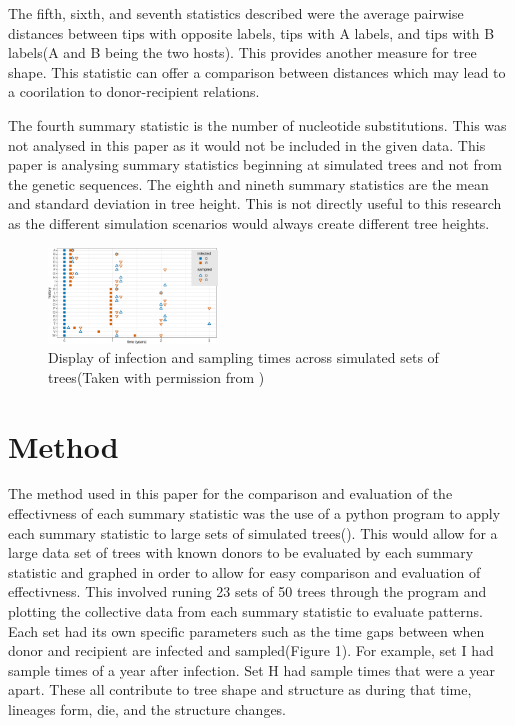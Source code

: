 \documentclass[final,5p,times,twocolumn,authoryear]{elsarticle}
\begin{document}
The fifth, sixth, and seventh statistics described were the average pairwise distances between tips with opposite labels, tips with A labels, and tips with B labels(A and B being the two hosts). This provides another measure for tree shape. This statistic can offer a comparison between distances which may lead to a coorilation to donor-recipient relations.

The fourth summary statistic is the number of nucleotide substitutions. This was not analysed in this paper as it would not be included in the given data. This paper is analysing summary statistics beginning at simulated trees and not from the genetic sequences. The eighth and nineth summary statistics are the mean and standard deviation in tree height. This is not directly useful to this research as the different simulation scenarios would always create different tree heights.


\begin{figure}
  \centering
  \includegraphics[width=0.4\textwidth, angle=0]{histories}
  \caption{Display of infection and sampling times across simulated sets of trees(Taken with permission from \citealt{simulation})}
  \label{fig_mom0}%
\end{figure}

\section{Method}
\label{method}

The method used in this paper for the comparison and evaluation of the effectivness of each summary statistic was the use of a python program to apply each summary statistic to large sets of simulated trees(\cite{10.1371/journal.pcbi.1009741}). This would allow for a large data set of trees with known donors to be evaluated by each summary statistic and graphed in order to allow for easy comparison and evaluation of effectivness. This involved runing 23 sets of 50 trees through the program and plotting the collective data from each summary statistic to evaluate patterns. Each set had its own specific parameters such as the time gaps between when donor and recipient are infected and sampled(Figure 1). For example, set I had sample times of a year after infection. Set H had sample times that were a year apart. These all contribute to tree shape and structure as during that time, lineages form, die, and the structure changes. 
\end{document}
